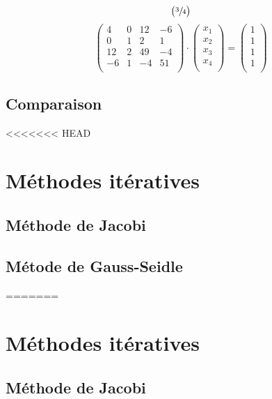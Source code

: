 \documentclass{report}
\begin{document}
\begin{enumerate}
\begin{equation}
\begin{pmatrix}
          \sfrac{3}{4} \\
        \end{pmatrix}
        \end{equation}
        \begin{equation}
        \begin{pmatrix}
		  4 & 0 & 12 & -6 \\
		  0 & 1 & 2 & 1 \\
		  12 & 2 & 49 & -4 \\
		  -6 & 1 & -4 & 51 \\
        \end{pmatrix}
        \cdot
        \begin{pmatrix}
          x_1 \\
          x_2 \\
          x_3 \\
          x_4 \\
        \end{pmatrix}
        =
        \begin{pmatrix}
          1 \\
          1 \\
          1 \\
          1 \\
        \end{pmatrix}
        \end{equation}
    \newpage
    \section{Comparaison}
<<<<<<< HEAD
    \newpage
    
   \chapter{Méthodes itératives}
    \section{Méthode de Jacobi}
     \newpage
    \section{Métode de Gauss-Seidle}
    
    
=======
  \chapter{Méthodes itératives}
  	\section{Méthode de Jacobi}

\end{enumerate}
\end{document}
